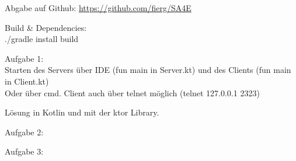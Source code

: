 \documentclass[10pt,a4paper]{article}
\begin{document}
	
\begin{boxedminipage}[t][17cm][t]{\textwidth}
	\par{
	Abgabe auf Github:
	\url{https://github.com/fierg/SA4E}
	
	\medskip
	
	Build \& Dependencies:\\
	./gradle install build\\
}

	\par{

	
	Aufgabe 1:\\
	Starten des Servers über IDE (fun main in Server.kt) und des Clients (fun main in Client.kt)\\
	Oder über cmd.
	Client auch über telnet möglich (telnet 127.0.0.1 2323)
	
	
	Lösung in Kotlin und mit der ktor Library.

	\medskip
}


	\par{
		Aufgabe 2:\\
		
		
	}
	
	
	\par{
	Aufgabe 3:\\
	
}
	
\end{boxedminipage}	
\end{document}

